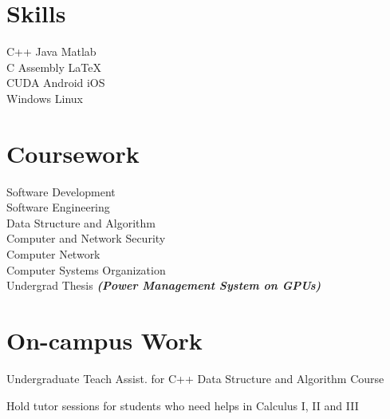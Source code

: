 \documentclass[]{deedy-resume-openfont}
\begin{document}
\begin{minipage}[t]{0.30\textwidth}

\section{Skills}
C++ \textbullet{} Java \textbullet{}  Matlab \\
C \textbullet{}  Assembly \textbullet{} \LaTeX\ \\ 
CUDA \textbullet{} Android \textbullet{} iOS \textbullet{} \\
Windows \textbullet{} Linux
\sectionsep


\section{Coursework}

Software Development \\
Software Engineering \\
Data Structure and Algorithm \\
Computer and Network Security \\
Computer Network \\
Computer Systems Organization \\
Undergrad Thesis {\footnotesize \textit{\textbf{(Power Management System on GPUs)}}} \\
\sectionsep

%
\section{On-campus Work} 
Undergraduate Teach Assist. for C++ Data Structure and Algorithm Course

Hold tutor sessions for students who need helps in Calculus I, II and III
\sectionsep

%
%

\end{minipage} 
\end{document}
